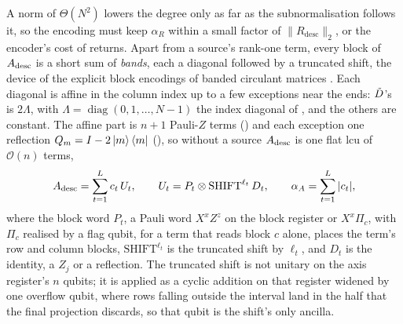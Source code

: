A norm of $\Theta(N^2)$ lowers the degree only as far as the subnormalisation follows it, so the encoding must keep $\alpha_R$ within a small factor of $\|R_{\mathrm{desc}}\|_2$, or the encoder's cost of  returns. Apart from a source's rank-one term, every block of $A_{\mathrm{desc}}$ is a short sum of \emph{bands}, each a diagonal followed by a truncated shift, the device of the explicit block encodings of banded circulant matrices \cite{camps2024explicit}. Each diagonal is affine in the column index up to a few exceptions near the ends: $\tilde{D}$'s is $2\Lambda$, with $\Lambda=\operatorname{diag}(0,1,\dots,N-1)$ the index diagonal of , and the others are constant. The affine part is $n+1$ Pauli-$Z$ terms () and each exception one reflection $Q_m=I-2\ket m\bra m$ (), so without a source $A_{\mathrm{desc}}$ is one flat \gls{lcu} of $\mathcal{O}(n)$ terms,
\begin{equation}
    A_{\mathrm{desc}} = \sum_{t=1}^{L} c_t\,U_t,
    \qquad
    U_t = P_t \otimes \mathrm{SHIFT}^{\ell_t}\,D_t,
    \qquad
    \alpha_A = \sum_{t=1}^{L} |c_t|,
    \label{eq:descriptor-lcu}
\end{equation}
where the block word $P_t$, a Pauli word $X^xZ^z$ on the block register or $X^x\Pi_c$, with $\Pi_c$ realised by a flag qubit, for a term that reads block $c$ alone, places the term's row and column blocks, $\mathrm{SHIFT}^{\ell_t}$ is the truncated shift by $\ell_t$, and $D_t$ is the identity, a $Z_j$ or a reflection. The truncated shift is not unitary on the axis register's $n$ qubits; it is applied as a cyclic addition on that register widened by one overflow qubit, where rows falling outside the interval land in the half that the final projection discards, so that qubit is the shift's only ancilla.

